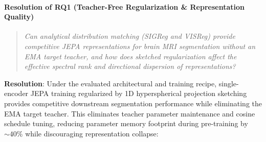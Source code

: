 \documentclass{article}
\begin{document}
\paragraph{Resolution of RQ1 (Teacher-Free Regularization \& Representation Quality)}
\begin{quote}
\emph{Can analytical distribution matching (SIGReg and VISReg) provide competitive JEPA representations for brain MRI segmentation without an EMA target teacher, and how does sketched regularization affect the effective spectral rank and directional dispersion of representations?}
\end{quote}
\textbf{Resolution}: Under the evaluated architectural and training recipe, single-encoder JEPA training regularized by 1D hyperspherical projection sketching provides competitive downstream segmentation performance while eliminating the EMA target teacher. This eliminates teacher parameter maintenance and cosine schedule tuning, reducing parameter memory footprint during pre-training by $\sim 40\%$ while discouraging representation collapse:
\end{document}
